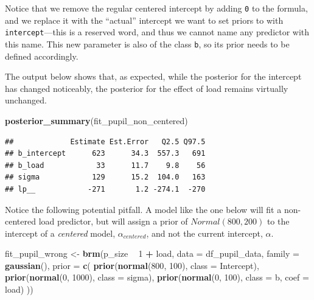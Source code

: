 \documentclass[12pt,]{krantz}
\newenvironment{Shaded}{\begin{snugshade}}{\end{snugshade}}
\newcommand{\DataTypeTok}[1]{\textcolor[rgb]{0.13,0.29,0.53}{#1}}
\newcommand{\DecValTok}[1]{\textcolor[rgb]{0.00,0.00,0.81}{#1}}
\newcommand{\KeywordTok}[1]{\textcolor[rgb]{0.13,0.29,0.53}{\textbf{#1}}}
\newcommand{\NormalTok}[1]{#1}
\newcommand{\OperatorTok}[1]{\textcolor[rgb]{0.81,0.36,0.00}{\textbf{#1}}}
\newcommand{\StringTok}[1]{\textcolor[rgb]{0.31,0.60,0.02}{#1}}
\theoremstyle{definition}
\theoremstyle{definition}
\theoremstyle{definition}
\theoremstyle{remark}
\begin{document}
Notice that we remove the regular centered intercept by adding \texttt{0} to the formula, and we replace it with the ``actual'' intercept we want to set priors to with \texttt{intercept}---this is a reserved word, and thus we cannot name any predictor with this name. This new parameter is also of the class \texttt{b}, so its prior needs to be defined accordingly.

The output below shows that, as expected, while the posterior for the intercept has changed noticeably, the posterior for the effect of load remains virtually unchanged.

\begin{Shaded}
\begin{Highlighting}[]
\KeywordTok{posterior_summary}\NormalTok{(fit_pupil_non_centered)}
\end{Highlighting}
\end{Shaded}

\begin{verbatim}
##             Estimate Est.Error   Q2.5 Q97.5
## b_intercept      623      34.3  557.3   691
## b_load            33      11.7    9.8    56
## sigma            129      15.2  104.0   163
## lp__            -271       1.2 -274.1  -270
\end{verbatim}

Notice the following potential pitfall. A model like the one below will fit a non-centered load predictor, but will assign a prior of \(Normal(800,200)\) to the intercept of a \emph{centered} model, \(\alpha_{centered}\), and not the current intercept, \(\alpha\).

\begin{Shaded}
\begin{Highlighting}[]
\NormalTok{fit_pupil_wrong <-}\StringTok{ }\KeywordTok{brm}\NormalTok{(p_size }\OperatorTok{~}\StringTok{ }\DecValTok{1} \OperatorTok{+}\StringTok{ }\NormalTok{load,}
                 \DataTypeTok{data =}\NormalTok{ df_pupil_data,}
                 \DataTypeTok{family =} \KeywordTok{gaussian}\NormalTok{(),}
                 \DataTypeTok{prior =} \KeywordTok{c}\NormalTok{(}
                     \KeywordTok{prior}\NormalTok{(}\KeywordTok{normal}\NormalTok{(}\DecValTok{800}\NormalTok{, }\DecValTok{100}\NormalTok{), }\DataTypeTok{class =}\NormalTok{ Intercept),}
                     \KeywordTok{prior}\NormalTok{(}\KeywordTok{normal}\NormalTok{(}\DecValTok{0}\NormalTok{, }\DecValTok{1000}\NormalTok{), }\DataTypeTok{class =}\NormalTok{ sigma),}
                     \KeywordTok{prior}\NormalTok{(}\KeywordTok{normal}\NormalTok{(}\DecValTok{0}\NormalTok{, }\DecValTok{100}\NormalTok{), }\DataTypeTok{class =}\NormalTok{ b, }\DataTypeTok{coef =}\NormalTok{ load)}
\NormalTok{                 ))}
\end{Highlighting}
\end{Shaded}
\end{document}
